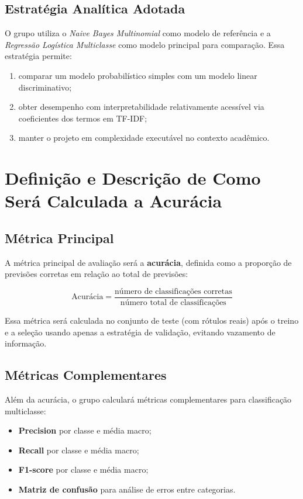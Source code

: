 \documentclass[12pt,a4paper]{article}
\begin{document}
\subsection{Estratégia Analítica Adotada}

O grupo utiliza o \textit{Naive Bayes Multinomial} como modelo de referência e a \textit{Regressão Logística Multiclasse} como modelo principal para comparação. Essa estratégia permite:

\begin{enumerate}[leftmargin=1.2cm]
    \item comparar um modelo probabilístico simples com um modelo linear discriminativo;
    \item obter desempenho com interpretabilidade relativamente acessível via coeficientes dos termos em TF-IDF;
    \item manter o projeto em complexidade executável no contexto acadêmico.
\end{enumerate}

\clearpage
\section{Definição e Descrição de Como Será Calculada a Acurácia}

\subsection{Métrica Principal}

A métrica principal de avaliação será a \textbf{acurácia}, definida como a proporção de previsões corretas em relação ao total de previsões:

\[
\text{Acurácia} = \frac{\text{número de classificações corretas}}{\text{número total de classificações}}
\]

Essa métrica será calculada no conjunto de teste (com rótulos reais) após o treino e a seleção usando apenas a estratégia de validação, evitando vazamento de informação.

\subsection{Métricas Complementares}

Além da acurácia, o grupo calculará métricas complementares para classificação multiclasse:
\begin{itemize}[leftmargin=1.2cm]
    \item \textbf{Precision} por classe e média macro;
    \item \textbf{Recall} por classe e média macro;
    \item \textbf{F1-score} por classe e média macro;
    \item \textbf{Matriz de confusão} para análise de erros entre categorias.
\end{itemize}
\end{document}
